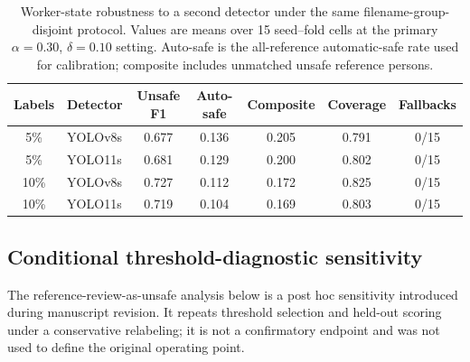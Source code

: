 \documentclass[iicol,pdflatex,sn-mathphys-num]{sn-jnl}
\begin{document}
\begin{table}[t]
\caption{Worker-state robustness to a second detector under the same filename-group-disjoint protocol. Values are means over 15 seed--fold cells at the primary $\alpha=0.30$, $\delta=0.10$ setting. Auto-safe is the all-reference automatic-safe rate used for calibration; composite includes unmatched unsafe reference persons.}
\label{tab:detector_robustness}
\centering
\scriptsize
\setlength{\tabcolsep}{5pt}
\begin{tabular}{@{}c l c c c c c@{}}
\toprule
Labels & Detector & Unsafe F1 & Auto-safe & Composite & Coverage & Fallbacks \\
\midrule
5\%  & YOLOv8s  & 0.677 & 0.136 & 0.205 & 0.791 & 0/15 \\
5\%  & YOLO11s  & 0.681 & 0.129 & 0.200 & 0.802 & 0/15 \\
10\% & YOLOv8s  & 0.727 & 0.112 & 0.172 & 0.825 & 0/15 \\
10\% & YOLO11s  & 0.719 & 0.104 & 0.169 & 0.803 & 0/15 \\
\bottomrule
\end{tabular}
\end{table}


\subsection{Conditional threshold-diagnostic sensitivity}

The reference-review-as-unsafe analysis below is a post hoc sensitivity introduced during manuscript revision. It repeats threshold selection and held-out scoring under a conservative relabeling; it is not a confirmatory endpoint and was not used to define the original operating point.
\end{document}
